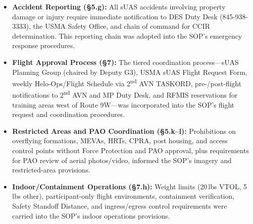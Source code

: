 \begin{itemize}
            \item \textbf{Accident Reporting ({\S}5.g):} All sUAS accidents involving property damage or injury require immediate notification to DES Duty Desk (845-938-3333), the USMA Safety Office, and chain of command for CCIR determination.  This reporting chain was adopted into the SOP's emergency response procedures.
            \item \textbf{Flight Approval Process ({\S}7):} The tiered coordination process---sUAS Planning Group (chaired by Deputy G3), USMA sUAS Flight Request Form, weekly Helo-Ops/Flight Schedule via 2\textsuperscript{nd} AVN TASKORD, pre-/post-flight notifications to 2\textsuperscript{nd} AVN and MP Duty Desk, and RFMIS reservations for training areas west of Route 9W---was incorporated into the SOP's flight request and coordination procedures.
            \item \textbf{Restricted Areas and PAO Coordination ({\S}5.k--l):} Prohibitions on overflying formations, MEVAs, HRTs, CPRA, post housing, and access control points without Force Protection and PAO approval, plus requirements for PAO review of aerial photos/video, informed the SOP's imagery and restricted-area provisions.
            \item \textbf{Indoor/Containment Operations ({\S}7.h):} Weight limits (20\,lbs VTOL, 5\,lbs other), participant-only flight environments, containment verification, Safety Standoff Distance, and ingress/egress control requirements were carried into the SOP's indoor operations provisions.
        \end{itemize}